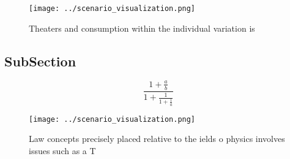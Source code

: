 \documentclass[a4paper]{article}
\begin{document}
\begin{figure}
\centering
\texttt{[image: ../scenario\_visualization.png]}
\caption{Theaters and consumption within the individual variation is
}
\end{figure}
 
\subsection{SubSection}

\[ \frac{1+\frac{a}{b}}{1+\frac{1}{1+\frac{1}{a}}} \]

\begin{figure}
\centering
\texttt{[image: ../scenario\_visualization.png]}
\caption{Law concepts precisely placed relative to the ields o physics involves issues such as a T
}
\end{figure}
 
\end{document}

